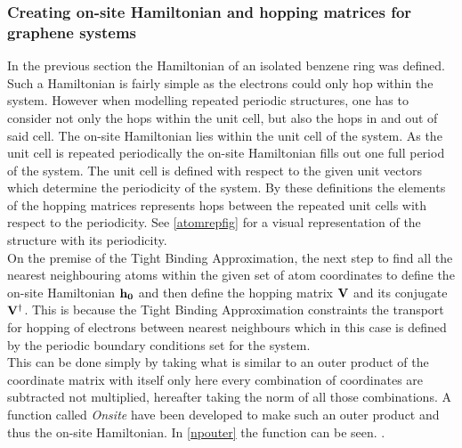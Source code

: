 \subsubsection{Creating on-site Hamiltonian and hopping matrices for graphene systems}
In the previous section the Hamiltonian of an isolated benzene ring was defined. Such a Hamiltonian is fairly simple as the electrons could only hop within the system. However when modelling repeated periodic structures, one has to consider not only the hops within the unit cell, but also the hops in and out of said cell.
The on-site Hamiltonian lies within the unit cell of the system. As the unit cell is repeated periodically the on-site Hamiltonian fills out one full period of the system. The unit cell is defined with respect to the given unit vectors which determine the periodicity of the system. By these definitions the elements of the hopping matrices represents hops between the repeated unit cells with respect to the periodicity. See \cref{atomrepfig} for a visual representation of the structure with its periodicity. \\
On the premise of the Tight Binding Approximation, the next step to find all the nearest neighbouring atoms within the given set of atom coordinates to define the on-site Hamiltonian \(\bf{h}_0\) and then define the hopping matrix \(\bf{V}\) and its conjugate \(\bf{V}^{\dagger}\). This is because the Tight Binding Approximation constraints the  transport for hopping of electrons between nearest neighbours which in this case is defined by the periodic boundary conditions set for the system.\\ This can be done simply by taking what is similar to an outer product of the coordinate matrix with itself only here every combination of coordinates are subtracted not multiplied, hereafter taking the norm of all those combinations. A function called \textit{Onsite} have been developed to make such an outer product and thus the on-site Hamiltonian. In \cref{npouter} the function can be seen.
. 
\vspace{-1\baselineskip}
\vspace{\baselineskip}
